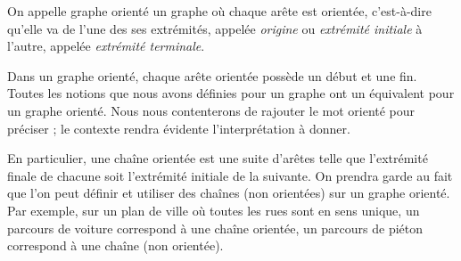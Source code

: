 \documentclass[french]{book}
\begin{document}
\begin{defn}
On appelle graphe orienté un graphe où chaque arête est orientée, c'est-à-dire
qu'elle va de l'une des ses extrémités, appelée \emph{origine} ou \emph{extrémité initiale} à l'autre, appelée
\emph{extrémité terminale}.
\end{defn}



Dans un graphe orienté, chaque arête orientée possède un début et une fin.
Toutes les notions que nous avons définies pour un graphe ont un équivalent pour un graphe
orienté. Nous nous contenterons de rajouter le mot \og orienté \fg{} pour préciser ; le contexte rendra
évidente l'interprétation à donner.

En particulier, une chaîne orientée est une suite d'arêtes telle que l'extrémité finale de chacune
soit l'extrémité initiale de la suivante. On prendra garde au fait que l'on peut définir et utiliser
des chaînes (non orientées) sur un graphe orienté. Par exemple, sur un plan de ville où toutes les
rues sont en sens unique, un parcours de voiture correspond à une chaîne orientée, un parcours de
piéton correspond à une chaîne (non orientée).
\end{document}
